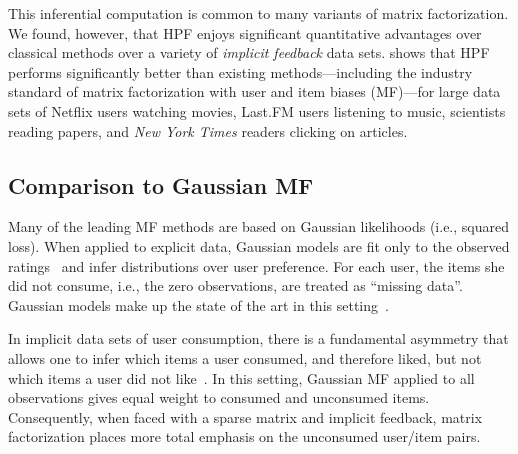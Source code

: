 

This inferential computation is common to many variants of matrix
factorization.  We found, however, that HPF enjoys significant
quantitative advantages over classical methods over a variety of
\emph{implicit feedback} data sets.  shows
that HPF performs significantly better than existing
methods---including the industry standard of matrix factorization with
user and item biases (MF)---for large data sets of Netflix users
watching movies, Last.FM users listening to music, scientists reading
papers, and \textit{New York Times} readers clicking on articles.

\subsection{Comparison to Gaussian MF}
Many of the leading MF methods are based on Gaussian likelihoods
(i.e., squared loss). When applied to explicit data, Gaussian models
are fit only to the observed ratings~\cite{Koren:2009} and infer
distributions over user preference. For each user, the items she did
not consume, i.e., the zero observations, are treated as ``missing
data''. Gaussian models make up the state of the art in this
setting~\cite{Salakhutdinov:2008, Salakhutdinov:2008a,Koren:2009}.

In implicit data sets of user consumption, there is a fundamental
asymmetry that allows one to infer which items a user consumed, and
therefore liked, but not which items a user did not
like~\cite{Hu:2008p9402}. In this setting, Gaussian MF applied to all
observations gives equal weight to consumed and unconsumed items.
Consequently, when faced with a sparse matrix and implicit feedback,
matrix factorization places more total emphasis on the unconsumed
user/item pairs.

